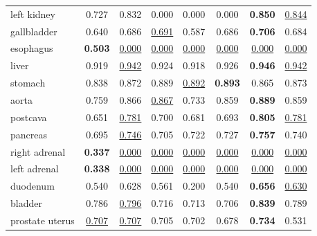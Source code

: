 \begin{minipage}{\textwidth}
{\begin{tabular}{@{}lccccccc@{}}
left kidney & 0.727 & 0.832 & 0.000 & 0.000 & 0.000 & \textbf{0.850} & \underline{0.844} \\
gallbladder & 0.640 & 0.686 & \underline{0.691} & 0.587 & 0.686 & \textbf{0.706} & 0.684 \\
esophagus & \textbf{0.503} & \underline{0.000} & \underline{0.000} & \underline{0.000} & \underline{0.000} & \underline{0.000} & \underline{0.000} \\
liver & 0.919 & \underline{0.942} & 0.924 & 0.918 & 0.926 & \textbf{0.946} & \underline{0.942} \\
stomach & 0.838 & 0.872 & 0.889 & \underline{0.892} & \textbf{0.893} & 0.865 & 0.873 \\
aorta & 0.759 & 0.866 & \underline{0.867} & 0.733 & 0.859 & \textbf{0.889} & 0.859 \\
postcava & 0.651 & \underline{0.781} & 0.700 & 0.681 & 0.693 & \textbf{0.805} & \underline{0.781} \\
pancreas & 0.695 & \underline{0.746} & 0.705 & 0.722 & 0.727 & \textbf{0.757} & 0.740 \\
right adrenal & \textbf{0.337} & \underline{0.000} & \underline{0.000} & \underline{0.000} & \underline{0.000} & \underline{0.000} & \underline{0.000} \\
left adrenal & \textbf{0.338} & \underline{0.000} & \underline{0.000} & \underline{0.000} & \underline{0.000} & \underline{0.000} & \underline{0.000} \\
duodenum & 0.540 & 0.628 & 0.561 & 0.200 & 0.540 & \textbf{0.656} & \underline{0.630} \\
bladder & 0.786 & \underline{0.796} & 0.716 & 0.713 & 0.706 & \textbf{0.839} & 0.789 \\
prostate uterus & \underline{0.707} & \underline{0.707} & 0.705 & 0.702 & 0.678 & \textbf{0.734} & 0.531 \\
\bottomrule
\end{tabular}
}\end{minipage}
\par\bigskip
